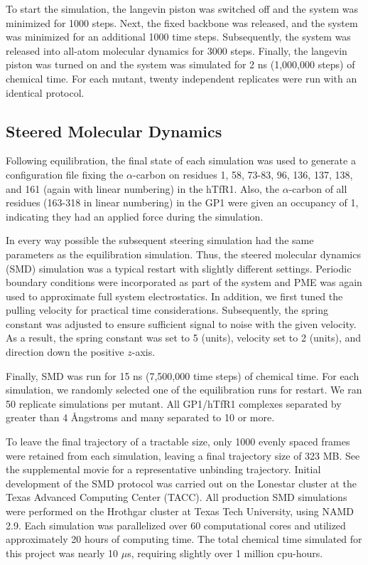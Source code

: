\documentclass[12pt]{article}
\begin{document}
To start the simulation, the langevin piston was switched off and the system was minimized for 1000 steps. Next, the fixed backbone was released, and the system was minimized for an additional 1000 time steps. Subsequently, the system was released into all-atom molecular dynamics for 3000 steps. Finally, the langevin piston was turned on and the system was simulated for 2 ns (1,000,000 steps) of chemical time. For each mutant, twenty independent replicates were run with an identical protocol.

\subsection*{Steered Molecular Dynamics}

Following equilibration, the final state of each simulation was used to generate a configuration file fixing the $\alpha$-carbon on residues 1, 58, 73-83, 96, 136, 137, 138, and 161 (again with linear numbering) in the hTfR1. Also, the $\alpha$-carbon of all residues (163-318 in linear numbering) in the GP1 were given an occupancy of 1, indicating they had an applied force during the simulation. 

In every way possible the subsequent steering simulation had the same parameters as the equilibration simulation. Thus, the steered molecular dynamics (SMD) \citep{Is2001B} simulation was a typical restart with slightly different settings. Periodic boundary conditions were incorporated as part of the system and PME was again used to approximate full system electrostatics. In addition, we first tuned the pulling velocity for practical time considerations. Subsequently, the spring constant was adjusted to ensure sufficient signal to noise with the given velocity. As a result, the spring constant was set to 5 (units), velocity set to 2 (units), and direction down the positive $z$-axis.

Finally, SMD was run for 15 ns (7,500,000 time steps) of chemical time. For each simulation, we randomly selected one of the equilibration runs for restart. We ran 50 replicate simulations per mutant. All GP1/hTfR1 complexes separated by greater than 4 \AA ngstroms and many separated to 10 or more.

To leave the final trajectory of a tractable size, only 1000 evenly spaced frames were retained from each simulation, leaving a final trajectory size of 323 MB. See the supplemental movie for a representative unbinding trajectory. Initial development of the SMD protocol was carried out on the Lonestar cluster at the Texas Advanced Computing Center (TACC). All production SMD simulations were performed on the Hrothgar cluster at Texas Tech University, using NAMD 2.9. Each simulation was parallelized over 60 computational cores and utilized approximately 20 hours of computing time. The total chemical time simulated for this project was nearly 10 $\mu$s, requiring slightly over 1 million cpu-hours.
\end{document}
